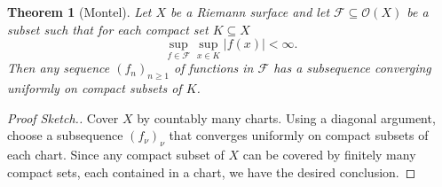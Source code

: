 \documentclass[10pt]{article}
\theoremstyle{thmstyle}
\newtheorem{theorem}{Theorem}[section]
\theoremstyle{defstyle}
\newcommand{\scrO}{\mathscr{O}} %
\renewcommand{\ge}{\geqslant}
\begin{document}
\begin{theorem}[Montel]
    Let $X$ be a Riemann surface and let $\mathcal{F}\subseteq\scrO(X)$ be a subset such that for each compact set $K\subseteq X$
    \begin{equation*}
        \sup_{f\in\mathcal F}\sup_{x\in K} |f(x)| < \infty.
    \end{equation*}
    Then any sequence $(f_n)_{n\ge 1}$ of functions in $\mathcal F$ has a subsequence converging uniformly on compact subsets of $K$.
\end{theorem}
\begin{proof}[Proof Sketch.]
    Cover $X$ by countably many charts. Using a diagonal argument, choose a subsequence $(f_\nu)_{\nu}$ that converges uniformly on compact subsets of each chart. Since any compact subset of $X$ can be covered by finitely many compact sets, each contained in a chart, we have the desired conclusion.
\end{proof}
\end{document}
